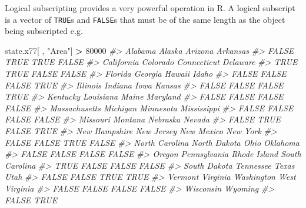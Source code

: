 \documentclass[
]{book}
\newenvironment{Shaded}{\begin{snugshade}}{\end{snugshade}}
\newcommand{\CommentTok}[1]{\textcolor[rgb]{0.56,0.35,0.01}{\textit{#1}}}
\newcommand{\DecValTok}[1]{\textcolor[rgb]{0.00,0.00,0.81}{#1}}
\newcommand{\NormalTok}[1]{#1}
\newcommand{\SpecialCharTok}[1]{\textcolor[rgb]{0.81,0.36,0.00}{\textbf{#1}}}
\newcommand{\StringTok}[1]{\textcolor[rgb]{0.31,0.60,0.02}{#1}}
\begin{document}
Logical subscripting provides a very powerful operation in R. A logical subscript is a vector of \texttt{TRUE}s and \texttt{FALSE}s that must be of the same length as the object being subscripted e.g.

\begin{Shaded}
\begin{Highlighting}[]
\NormalTok{state.x77[ , }\StringTok{"Area"}\NormalTok{] }\SpecialCharTok{\textgreater{}} \DecValTok{80000}  
\CommentTok{\#\textgreater{}        Alabama         Alaska        Arizona       Arkansas }
\CommentTok{\#\textgreater{}          FALSE           TRUE           TRUE          FALSE }
\CommentTok{\#\textgreater{}     California       Colorado    Connecticut       Delaware }
\CommentTok{\#\textgreater{}           TRUE           TRUE          FALSE          FALSE }
\CommentTok{\#\textgreater{}        Florida        Georgia         Hawaii          Idaho }
\CommentTok{\#\textgreater{}          FALSE          FALSE          FALSE           TRUE }
\CommentTok{\#\textgreater{}       Illinois        Indiana           Iowa         Kansas }
\CommentTok{\#\textgreater{}          FALSE          FALSE          FALSE           TRUE }
\CommentTok{\#\textgreater{}       Kentucky      Louisiana          Maine       Maryland }
\CommentTok{\#\textgreater{}          FALSE          FALSE          FALSE          FALSE }
\CommentTok{\#\textgreater{}  Massachusetts       Michigan      Minnesota    Mississippi }
\CommentTok{\#\textgreater{}          FALSE          FALSE          FALSE          FALSE }
\CommentTok{\#\textgreater{}       Missouri        Montana       Nebraska         Nevada }
\CommentTok{\#\textgreater{}          FALSE           TRUE          FALSE           TRUE }
\CommentTok{\#\textgreater{}  New Hampshire     New Jersey     New Mexico       New York }
\CommentTok{\#\textgreater{}          FALSE          FALSE           TRUE          FALSE }
\CommentTok{\#\textgreater{} North Carolina   North Dakota           Ohio       Oklahoma }
\CommentTok{\#\textgreater{}          FALSE          FALSE          FALSE          FALSE }
\CommentTok{\#\textgreater{}         Oregon   Pennsylvania   Rhode Island South Carolina }
\CommentTok{\#\textgreater{}           TRUE          FALSE          FALSE          FALSE }
\CommentTok{\#\textgreater{}   South Dakota      Tennessee          Texas           Utah }
\CommentTok{\#\textgreater{}          FALSE          FALSE           TRUE           TRUE }
\CommentTok{\#\textgreater{}        Vermont       Virginia     Washington  West Virginia }
\CommentTok{\#\textgreater{}          FALSE          FALSE          FALSE          FALSE }
\CommentTok{\#\textgreater{}      Wisconsin        Wyoming }
\CommentTok{\#\textgreater{}          FALSE           TRUE}
\end{Highlighting}
\end{Shaded}
\end{document}
